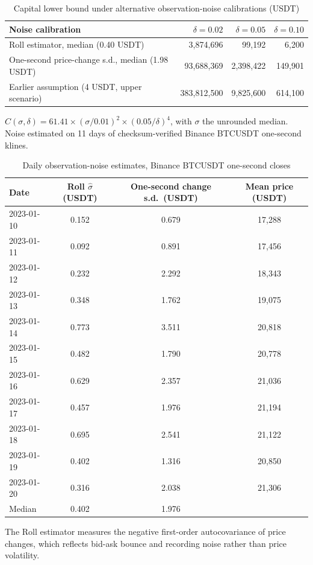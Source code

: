 \begin{table}[t]\centering
\begin{threeparttable}
\caption{Capital lower bound under alternative observation-noise calibrations (USDT)}\label{tab:capital}
\begin{tabular}{lrrr}
\toprule
Noise calibration & $\delta=0.02$ & $\delta=0.05$ & $\delta=0.10$\\
\midrule
Roll estimator, median (0.40 USDT) & 3{,}874{,}696 & 99{,}192 & 6{,}200\\
One-second price-change s.d., median (1.98 USDT) & 93{,}688{,}369 & 2{,}398{,}422 & 149{,}901\\
Earlier assumption (4 USDT, upper scenario) & 383{,}812{,}500 & 9{,}825{,}600 & 614{,}100\\
\bottomrule
\end{tabular}
\begin{tablenotes}\footnotesize
\item $C(\sigma,\delta)=61.41\times(\sigma/0.01)^2\times(0.05/\delta)^4$, with $\sigma$ the unrounded median. Noise estimated on 11 days of checksum-verified Binance BTCUSDT one-second klines. \end{tablenotes}
\end{threeparttable}
\end{table}

\begin{table}[t]\centering\small
\begin{threeparttable}
\caption{Daily observation-noise estimates, Binance BTCUSDT one-second closes}\label{tab:roll}
\begin{tabular}{lccc}
\toprule
Date & Roll $\hat\sigma$ (USDT) & One-second change s.d.\ (USDT) & Mean price (USDT)\\
\midrule
2023-01-10 & 0.152 & 0.679 & 17{,}288\\
2023-01-11 & 0.092 & 0.891 & 17{,}456\\
2023-01-12 & 0.232 & 2.292 & 18{,}343\\
2023-01-13 & 0.348 & 1.762 & 19{,}075\\
2023-01-14 & 0.773 & 3.511 & 20{,}818\\
2023-01-15 & 0.482 & 1.790 & 20{,}778\\
2023-01-16 & 0.629 & 2.357 & 21{,}036\\
2023-01-17 & 0.457 & 1.976 & 21{,}194\\
2023-01-18 & 0.695 & 2.541 & 21{,}122\\
2023-01-19 & 0.402 & 1.316 & 20{,}850\\
2023-01-20 & 0.316 & 2.038 & 21{,}306\\
\midrule
Median & 0.402 & 1.976 & \\
\bottomrule
\end{tabular}
\begin{tablenotes}\footnotesize\item The Roll estimator measures the negative first-order autocovariance of price changes, which reflects bid-ask bounce and recording noise rather than price volatility.\end{tablenotes}
\end{threeparttable}
\end{table}


